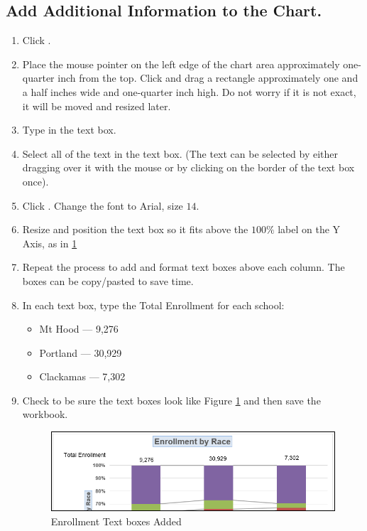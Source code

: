 \subsection{Add Additional Information to the Chart.}

\begin{enumerate}
	\item Click .
	\item Place the mouse pointer on the left edge of the chart area approximately one-quarter inch from the top. Click and drag a rectangle approximately one and a half inches wide and one-quarter inch high. Do not worry if it is not exact, it will be moved and resized later.
	\item Type  in the text box.
	\item Select all of the text in the text box. (The text can be selected by either dragging over it with the mouse or by clicking on the border of the text box once). 
	\item Click . Change the font to Arial, size $ 14 $.
	\item Resize and position the text box so it fits above the $ 100\% $ label on the Y Axis, as in \ref{04:fig43}
	\item Repeat the process to add and format text boxes above each column. The boxes can be copy/pasted to save time.
	\item In each text box, type the Total Enrollment for each school:

	\begin{itemize}
		\item Mt Hood --- 9,276
		\item Portland --- 30,929
		\item Clackamas --- 7,302
	\end{itemize}

	\item Check to be sure the text boxes look like Figure \ref{04:fig43} and then save the workbook.

	\begin{figure}[H]
		\centering
		\includegraphics[width=\maxwidth{.95\linewidth}]{gfx/ch04_fig43}
		\caption{Enrollment Text boxes Added}
		\label{04:fig43}
	\end{figure}


\end{enumerate}
